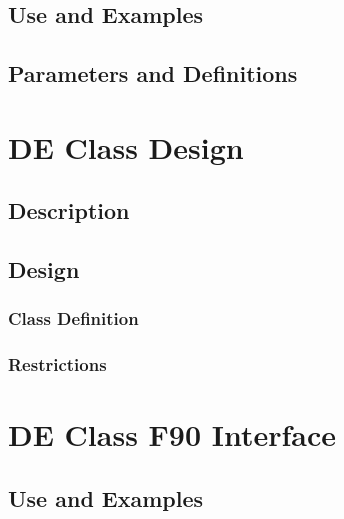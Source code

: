 \documentclass[]{article}
\begin{document}
\subsection{Use and Examples}




\subsection{Parameters and Definitions}

%







\section{DE Class Design}

\subsection{Description}




\subsection{Design}




\subsubsection{Class Definition}




\subsubsection{Restrictions}

%


\section{DE Class F90 Interface}

\subsection{Use and Examples}
\end{document}
